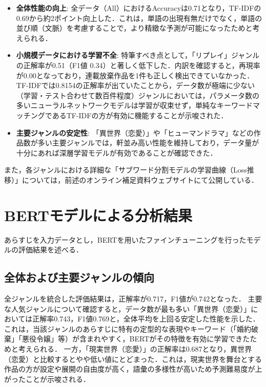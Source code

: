 \documentclass[uplatex, dvipdfmx, 11pt, a4paper, report]{jsbook}
\begin{document}
\begin{itemize}
    \item \textbf{全体性能の向上}: 
    全データ（All）におけるAccuracyは0.71となり，TF-IDFの0.69から約2ポイント向上した．これは，単語の出現有無だけでなく，単語の並び順（文脈）を考慮することで，より精緻な予測が可能になったためと考えられる．
    \item \textbf{小規模データにおける学習不全}: 
    特筆すべき点として，「リプレイ」ジャンルの正解率が0.51（F1値 0.34）と著しく低下した．内訳を確認すると，再現率が0.00となっており，連載放棄作品を1件も正しく検出できていなかった．
    TF-IDFでは0.8154の正解率が出ていたことから，データ数が極端に少ない（学習・テスト合わせて数百件程度）ジャンルにおいては，パラメータ数の多いニューラルネットワークモデルは学習が収束せず，単純なキーワードマッチングであるTF-IDFの方が有効に機能することが示唆された．
    \item \textbf{主要ジャンルの安定性}: 
    「異世界（恋愛）」や「ヒューマンドラマ」などの作品数が多い主要ジャンルでは，軒並み高い性能を維持しており，データ量が十分にあれば深層学習モデルが有効であることが確認できた．
\end{itemize}

また，各ジャンルにおける詳細な「サブワード分割モデルの学習曲線（Loss推移）」については，前述のオンライン補足資料ウェブサイトにて公開している．

\section{BERTモデルによる分析結果}

あらすじを入力データとし，BERTを用いたファインチューニングを行ったモデルの評価結果を述べる．

\subsection{全体および主要ジャンルの傾向}
全ジャンルを統合した評価結果は，正解率が0.717，F1値が0.742となった．
主要な人気ジャンルについて確認すると，データ数が最も多い「異世界（恋愛）」においては正解率0.743，F1値0.769と，全体平均を上回る安定した性能を示した．これは，当該ジャンルのあらすじに特有の定型的な表現やキーワード（「婚約破棄」「悪役令嬢」等）が含まれやすく，BERTがその特徴を有効に学習できたためと考えられる．
一方，「現実世界（恋愛）」の正解率は0.687となり，異世界（恋愛）と比較するとやや低い値にとどまった．これは，現実世界を舞台とする作品の方が設定や展開の自由度が高く，語彙の多様性が高いため予測難易度が上がったことが示唆される．
\end{document}
